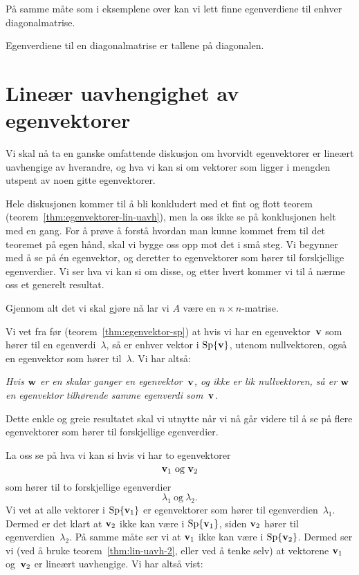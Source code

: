På samme måte som i eksemplene over kan vi lett finne egenverdiene til
enhver diagonalmatrise.

\begin{thm}
Egenverdiene til en diagonalmatrise er tallene på diagonalen.
\end{thm}


\section*{Lineær uavhengighet av egenvektorer}

Vi skal nå ta en ganske omfattende diskusjon om hvorvidt egenvektorer
er lineært uavhengige av hverandre, og hva vi kan si om vektorer som
ligger i mengden utspent av noen gitte egenvektorer.

Hele diskusjonen kommer til å bli konkludert med et fint og flott
teorem (teorem~\ref{thm:egenvektorer-lin-uavh}), men la oss ikke se på
konklusjonen helt med en gang.  For å prøve å forstå hvordan man kunne
kommet frem til det teoremet på egen hånd, skal vi bygge oss opp mot
det i små steg.  Vi begynner med å se på én egenvektor, og deretter to
egenvektorer som hører til forskjellige egenverdier.  Vi ser hva vi
kan si om disse, og etter hvert kommer vi til å nærme oss et generelt
resultat.

Gjennom alt det vi skal gjøre nå lar vi $A$ være en
$n \times n$-matrise.

Vi vet fra før (teorem~\ref{thm:egenvektor-sp}) at hvis vi har en
egenvektor~$\mathbf{v}$ som hører til en egenverdi~$\lambda$, så er enhver
vektor i $\operatorname{Sp} \{ \mathbf{v} \}$, utenom nullvektoren, også en egenvektor
som hører til~$\lambda$.  Vi har altså:

\smallskip
\noindent\emph{Hvis $\mathbf{w}$ er en skalar ganger en egenvektor~$\mathbf{v}$,
 og ikke er lik nullvektoren,
 så er $\mathbf{w}$ en egenvektor tilhørende samme egenverdi som~$\mathbf{v}$.}
\smallskip

Dette enkle og greie resultatet skal vi utnytte når vi nå går videre
til å se på flere egenvektorer som hører til forskjellige egenverdier.

\smallskip
La oss se på hva vi kan si hvis vi har to egenvektorer
\[
\mathbf{v}_1\ \text{og}\ \mathbf{v}_2
\]
som hører til to forskjellige egenverdier
\[
\lambda_1\ \text{og}\ \lambda_2.
\]
Vi vet at alle vektorer i $\operatorname{Sp} \{ \mathbf{v}_1 \}$ er egenvektorer som
hører til egenverdien~$\lambda_1$.  Dermed er det klart at $\mathbf{v}_2$
ikke kan være i $\operatorname{Sp} \{ \mathbf{v}_1 \}$, siden $\mathbf{v}_2$ hører til
egenverdien~$\lambda_2$.  På samme måte ser vi at $\mathbf{v}_1$ ikke kan
være i $\operatorname{Sp} \{ \mathbf{v}_2 \}$.  Dermed ser vi (ved å bruke
teorem~\ref{thm:lin-uavh-2}, eller ved å tenke selv) at vektorene
$\mathbf{v}_1$ og~$\mathbf{v}_2$ er lineært uavhengige.  Vi har altså vist:

